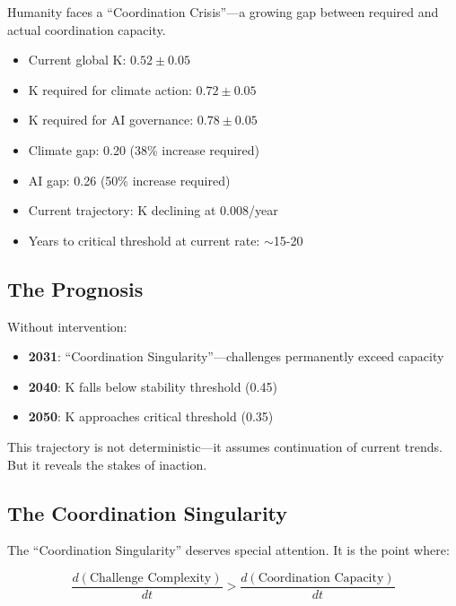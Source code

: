 \documentclass[12pt,letterpaper]{article}
\begin{document}
Humanity faces a ``Coordination Crisis''---a growing gap between required and actual coordination capacity.

\begin{warningbox}
\begin{itemize}
    \item Current global K: $0.52 \pm 0.05$
    \item K required for climate action: $0.72 \pm 0.05$
    \item K required for AI governance: $0.78 \pm 0.05$
    \item Climate gap: 0.20 (38\% increase required)
    \item AI gap: 0.26 (50\% increase required)
    \item Current trajectory: K declining at 0.008/year
    \item Years to critical threshold at current rate: $\sim$15-20
\end{itemize}
\end{warningbox}

\subsection{The Prognosis}

Without intervention:

\begin{itemize}
    \item \textbf{2031}: ``Coordination Singularity''---challenges permanently exceed capacity
    \item \textbf{2040}: K falls below stability threshold (0.45)
    \item \textbf{2050}: K approaches critical threshold (0.35)
\end{itemize}

This trajectory is not deterministic---it assumes continuation of current trends. But it reveals the stakes of inaction.

\subsection{The Coordination Singularity}

The ``Coordination Singularity'' deserves special attention. It is the point where:

\begin{equation}
\frac{d(\text{Challenge Complexity})}{dt} > \frac{d(\text{Coordination Capacity})}{dt}
\end{equation}
\end{document}

